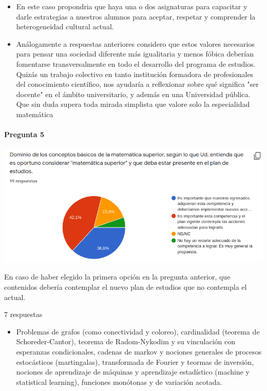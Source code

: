 \documentclass[a4paper,10pt,BCOR10mm,oneside,headsepline]{scrbook}
\begin{document}
\begin{subappendices}
\begin{itemize}
\item En este caso propondria que haya una o dos asignaturas para capacitar y darle estrategias a nuestros alumnos para aceptar, respetar y comprender la heterogeneidad cultural actual.

\item Análogamente a  respuestas anteriores considero que estos valores necesarios para pensar una sociedad diferente más igualitaria y menos fóbica deberían fomentarse transversalmente en todo el desarrollo del programa de estudios. Quizás un trabajo colectivo en tanto institución formadora de profesionales del conocimiento científico, nos ayudaría a reflexionar sobre qué significa "ser docente" en el ámbito universitario, y además en una Universidad pública. Que sin duda supera toda mirada simplista que valore solo la especialidad matemática
\end{itemize}
 \paragraph{Pregunta 5}
\begin{center}
 
\includegraphics[scale=.9]{doc05.png}
 \end{center}
 En caso de haber elegido la primera opción en la pregunta anterior, que contenidos debería contemplar el nuevo plan de estudios que no contempla el actual. 
 
 7 respuestas
 \begin{itemize}
 \item Problemas de grafos (como conectividad y coloreo), cardinalidad (teorema de Schoreder-Cantor), teorema de Radom-Nykodim y su vinculación con esperanzas condicionales, cadenas de markov y nociones generales de procesos estocásticos (martingalas),  transformada de Fourier y teormas de inversión, nociones de aprendizaje de máquinas y aprendizaje estadístico (machine y statistical learning), funciones monótonas y de variación acotada.
 

\end{itemize}
\end{subappendices}
\end{document}
